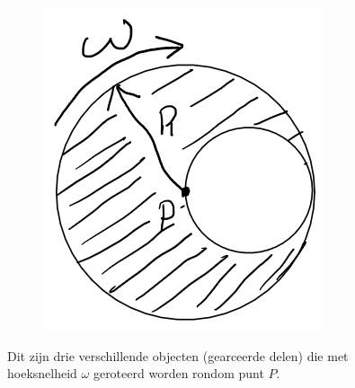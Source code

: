 \documentclass[a4paper,11pt]{article}
\begin{document}
\begin{figure}[H]
\begin{subfigure}[b]{0.25\textwidth}
		\caption{}
		\label{fig:Schijf2}
	\end{subfigure}
	\hfill
	\begin{subfigure}[b]{0.25\textwidth}
		\centering
		\includegraphics[width=\textwidth]{Schijf3}
		\caption{}
		\label{fig:Schijf3}
	\end{subfigure}
	\caption{Dit zijn drie verschillende objecten (gearceerde delen) die met hoeksnelheid $\omega$ geroteerd worden rondom punt $P$.}
	\label{fig:Schijven}
\end{figure}
\end{document}
